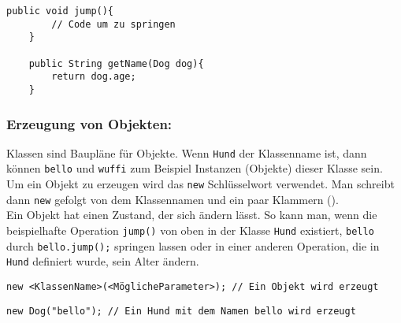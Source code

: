 \newpage

\begin{lstlisting}[title=\textbf{Beispiel: Operationen}]
	public void jump(){
		// Code um zu springen
	}

	public String getName(Dog dog){
		return dog.age;
	}
\end{lstlisting}

\begin{Infobox}
	\subsubsection*{Erzeugung von Objekten:}
	Klassen sind Baupläne für Objekte. Wenn \lstinline{Hund} der Klassenname ist, dann können \lstinline{bello} und \lstinline{wuffi} zum Beispiel Instanzen (Objekte) dieser Klasse sein.\\
	Um ein Objekt zu erzeugen wird das \lstinline{new} Schlüsselwort verwendet.
	Man schreibt dann \lstinline{new} gefolgt von dem Klassennamen und ein paar Klammern ().\\
	Ein Objekt hat einen Zustand, der sich ändern lässt. So kann man, wenn die beispielhafte Operation \lstinline{jump()} von oben in der Klasse \lstinline{Hund} existiert, \lstinline{bello} durch \lstinline{bello.jump();} springen lassen oder in einer anderen Operation, die in \lstinline{Hund} definiert wurde, sein Alter ändern.
\end{Infobox}

\begin{lstlisting}[title=\textbf{Syntax Objekt Erstellung}]
	new <KlassenName>(<MöglicheParameter>); // Ein Objekt wird erzeugt
\end{lstlisting}

\begin{lstlisting}[title=\textbf{Beispiel: Objekt Erstellung}]
	new Dog("bello"); // Ein Hund mit dem Namen bello wird erzeugt
\end{lstlisting}

